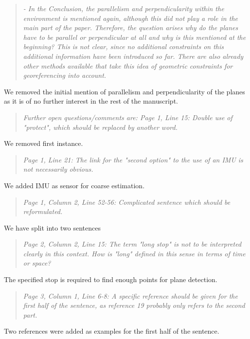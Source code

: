 \documentclass{article}
\newenvironment{itquote}
  {\begin{quote}\itshape}
  {\end{quote}\ignorespacesafterend}
\begin{document}
\begin{itquote}
- In the Conclusion, the parallelism and perpendicularity within the
environment is mentioned again, although this did not play a role in
the main part of the paper. Therefore, the question arises why do
the planes have to be parallel or perpendicular at all and why is
this mentioned at the beginning? This is not clear, since no
additional constraints on this additional information have been
introduced so far. There are also already other methods available
that take this idea of geometric constraints for georeferencing into
account.
\end{itquote}

We removed the initial mention of parallelism and perpendicularity of the planes
as it is of no further interest in the rest of the manuscript. 

\begin{itquote}
Further open questions/comments are:
Page 1, Line 15: Double use of "protect", which should be replaced
by another word.
\end{itquote}

We removed first instance.

\begin{itquote}
Page 1, Line 21: The link for the "second option" to the use of an
IMU is not necessarily obvious.
\end{itquote}

We added IMU as sensor for coarse estimation.

\begin{itquote}
Page 1, Column 2, Line 52-56: Complicated sentence which should be
reformulated.
\end{itquote}

We have split into two sentences

\begin{itquote}
Page 2, Column 2, Line 15: The term "long stop" is not to be
interpreted clearly in this context. How is "long" defined in this
sense in terms of time or space?
\end{itquote}

The specified stop is required to find enough points for plane
detection.

\begin{itquote}
Page 3, Column 1, Line 6-8: A specific reference should be given for
the first half of the sentence, as reference 19 probably only refers
to the second part.
\end{itquote}

Two references were added as examples for the first half of the sentence.
\end{document}
